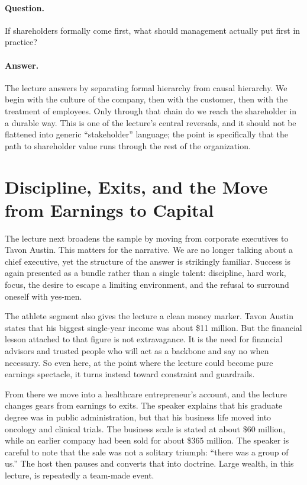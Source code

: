\paragraph{Question.} If shareholders formally come first, what should management actually put first in practice?

\paragraph{Answer.} The lecture answers by separating formal hierarchy from causal hierarchy. We begin with the culture of the company, then with the customer, then with the treatment of employees. Only through that chain do we reach the shareholder in a durable way. This is one of the lecture's central reversals, and it should not be flattened into generic ``stakeholder'' language; the point is specifically that the path to shareholder value runs through the rest of the organization.

\section{Discipline, Exits, and the Move from Earnings to Capital}

The lecture next broadens the sample by moving from corporate executives to Tavon Austin. This matters for the narrative. We are no longer talking about a chief executive, yet the structure of the answer is strikingly familiar. Success is again presented as a bundle rather than a single talent: discipline, hard work, focus, the desire to escape a limiting environment, and the refusal to surround oneself with yes-men.

The athlete segment also gives the lecture a clean money marker. Tavon Austin states that his biggest single-year income was about \$11 million. But the financial lesson attached to that figure is not extravagance. It is the need for financial advisors and trusted people who will act as a backbone and say no when necessary. So even here, at the point where the lecture could become pure earnings spectacle, it turns instead toward constraint and guardrails.

From there we move into a healthcare entrepreneur's account, and the lecture changes gears from earnings to exits. The speaker explains that his graduate degree was in public administration, but that his business life moved into oncology and clinical trials. The business scale is stated at about \$60 million, while an earlier company had been sold for about \$365 million. The speaker is careful to note that the sale was not a solitary triumph: ``there was a group of us.'' The host then pauses and converts that into doctrine. Large wealth, in this lecture, is repeatedly a team-made event.


